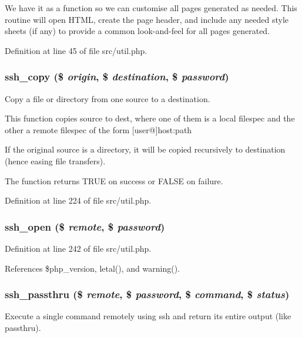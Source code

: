 We have it as a function so we can customise all pages generated as needed. This routine will open HTML, create the page header, and include any needed style sheets (if any) to provide a common look-and-feel for all pages generated. 

Definition at line 45 of file src/util.php.
\subsubsection{\setlength{\rightskip}{0pt plus 5cm}ssh\_\-copy (\$ {\em origin}, \$ {\em destination}, \$ {\em password})}\label{src_2util_8php_a6}


Copy a file or directory from one source to a destination. 

This function copies source to dest, where one of them is a local filespec and the other a remote filespec of the form [user@]host:path

If the original source is a directory, it will be copied recursively to destination (hence easing file transfers).

The function returns TRUE on success or FALSE on failure. 

Definition at line 224 of file src/util.php.
\subsubsection{\setlength{\rightskip}{0pt plus 5cm}ssh\_\-open (\$ {\em remote}, \$ {\em password})}\label{src_2util_8php_a7}




Definition at line 242 of file src/util.php.

References \$php\_\-version, letal(), and warning().
\subsubsection{\setlength{\rightskip}{0pt plus 5cm}ssh\_\-passthru (\$ {\em remote}, \$ {\em password}, \$ {\em command}, \$ {\em status})}\label{src_2util_8php_a5}


Execute a single command remotely using ssh and return its entire output (like passthru). 


